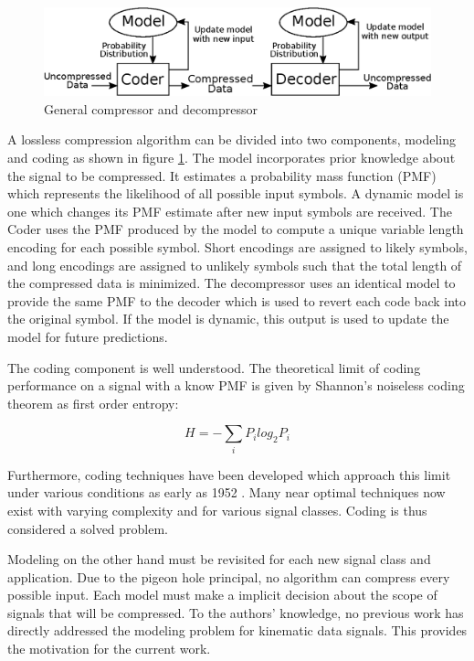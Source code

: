 \documentclass[journal]{IEEEtran}
\begin{document}
\begin{figure}
  \includegraphics[width=\linewidth]{general_compressor.eps}
  \caption{General compressor and decompressor}
  \label{fig:general_compressor}
\end{figure}

A lossless compression algorithm can be divided into two components, modeling and coding as shown in figure \ref{fig:general_compressor}. The model incorporates prior knowledge about the signal to be compressed. It estimates a probability mass function (PMF) which represents the likelihood of all possible input symbols. A dynamic model is one which changes its PMF estimate after new input symbols are received. The Coder uses the PMF produced by the model to compute a unique variable length encoding for each possible symbol. Short encodings are assigned to likely symbols, and long encodings are assigned to unlikely symbols such that the total length of the compressed data is minimized. The decompressor uses an identical model to provide the same PMF to the decoder which is used to revert each code back into the original symbol. If the model is dynamic, this output is used to update the model for future predictions.

The coding component is well understood. The theoretical limit of coding performance on a signal with a know PMF is given by Shannon's noiseless coding theorem\cite{Shannon1948} as first order entropy:

$$H = -\sum_{i} P_ilog_2P_i$$

Furthermore, coding techniques have been developed which approach this limit under various conditions as early as 1952 \cite{Huffman1952}. Many near optimal techniques now exist with varying complexity and for various signal classes. Coding is thus considered a solved problem.

Modeling on the other hand must be revisited for each new signal class and application. Due to the pigeon hole principal, no algorithm can compress every possible input. Each model must make a implicit decision about the scope of signals that will be compressed. To the authors' knowledge, no previous work has directly addressed the modeling problem for kinematic data signals. This provides the motivation for the current work.
\end{document}
